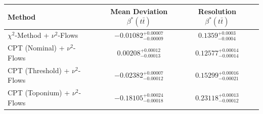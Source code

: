     \begin{tabular}{lccc}
        \toprule
        Method & Mean Deviation $\beta^*(t\bar{t})$ & Resolution $\beta^*(t\bar{t})$ \\
        \midrule
        $\chi^2$-Method + $\nu^2$-Flows & $-0.01082^{+0.00007}_{-0.00009}$ & $0.1359^{+0.0003}_{-0.0004}$ \\
        CPT (Nominal) + $\nu^2$-Flows & $0.00208^{+0.00012}_{-0.00013}$ & $0.12577^{+0.00014}_{-0.00014}$ \\
        CPT (Threshold) + $\nu^2$-Flows & $-0.02382^{+0.00007}_{-0.00012}$ & $0.15299^{+0.00016}_{-0.00021}$ \\
        CPT (Toponium) + $\nu^2$-Flows & $-0.18105^{+0.00024}_{-0.00018}$ & $0.23118^{+0.00013}_{-0.00012}$ \\
        \bottomrule
    \end{tabular}